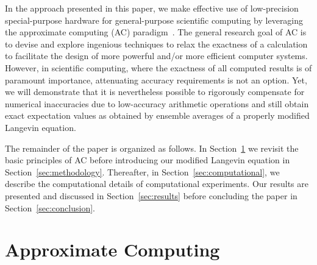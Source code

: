 \documentclass[format=acmsmall,review,timestamp,urlbreakonhyphens]{acmart}
\begin{document}
In the approach presented in this paper, we make effective use of low-precision special-purpose hardware for general-purpose scientific computing by leveraging the approximate computing (AC) paradigm~\cite{KlavikMalossiBekasEtAl2014, PlesslAC}. The general research goal of AC is to devise and explore ingenious techniques to relax the exactness of a calculation to facilitate the design of more powerful and/or more efficient computer systems. However, in scientific computing, where the exactness of all computed results is of paramount importance, attenuating accuracy requirements is not an option. Yet, we will demonstrate that it is nevertheless possible to rigorously compensate for numerical inaccuracies due to low-accuracy arithmetic operations and still obtain exact expectation values as obtained by ensemble averages of a properly modified Langevin equation.


The remainder of the paper is organized as follows. In Section~\ref{sec:ac} we revisit the basic principles of AC before introducing our modified Langevin equation in Section~\ref{sec:methodology}. Thereafter, in Section~\ref{sec:computational}, we describe the computational details of computational experiments. Our results are presented and discussed in Section~\ref{sec:results} before concluding the paper in Section~\ref{sec:conclusion}.


\section{Approximate Computing}
\label{sec:ac}
\end{document}
